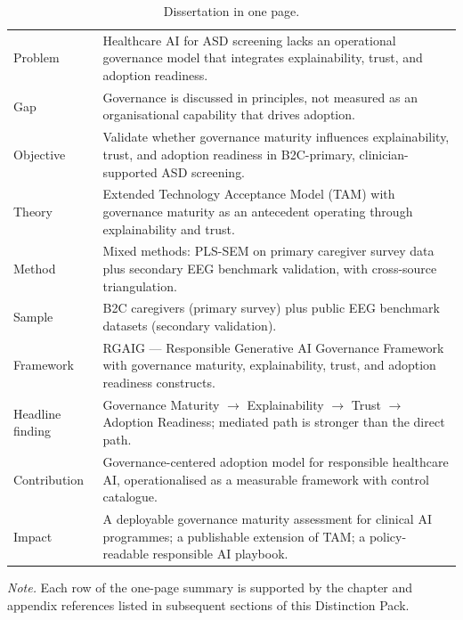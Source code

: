 {\tablestripes\tablefontsize
{}
\begin{xltabular}{\textwidth}{@{} >{\raggedright\arraybackslash}p{4.5cm} L @{}}
\caption[Dissertation in one page]{Dissertation in one page.}\label{tab:dist_one_page} \\
\toprule
{} &  \\
\midrule
\endfirsthead
\endhead
\bottomrule
\endlastfoot
Problem & Healthcare AI for ASD screening lacks an operational governance model that integrates explainability, trust, and adoption readiness. \\
\addlinespace
Gap & Governance is discussed in principles, not measured as an organisational capability that drives adoption. \\
\addlinespace
Objective & Validate whether governance maturity influences explainability, trust, and adoption readiness in B2C-primary, clinician-supported ASD screening. \\
\addlinespace
Theory & Extended Technology Acceptance Model (TAM) with governance maturity as an antecedent operating through explainability and trust. \\
\addlinespace
Method & Mixed methods: PLS-SEM on primary caregiver survey data plus secondary EEG benchmark validation, with cross-source triangulation. \\
\addlinespace
Sample & B2C caregivers (primary survey) plus public EEG benchmark datasets (secondary validation). \\
\addlinespace
Framework & RGAIG --- Responsible Generative AI Governance Framework with governance maturity, explainability, trust, and adoption readiness constructs. \\
\addlinespace
Headline finding & Governance Maturity $\rightarrow$ Explainability $\rightarrow$ Trust $\rightarrow$ Adoption Readiness; mediated path is stronger than the direct path. \\
\addlinespace
Contribution & Governance-centered adoption model for responsible healthcare AI, operationalised as a measurable framework with control catalogue. \\
\addlinespace
Impact & A deployable governance maturity assessment for clinical AI programmes; a publishable extension of TAM; a policy-readable responsible AI playbook. \\
\end{xltabular}}

\vspace{0.3em}\noindent\textit{Note.} Each row of the one-page summary is supported by the chapter and appendix references listed in subsequent sections of this Distinction Pack.

